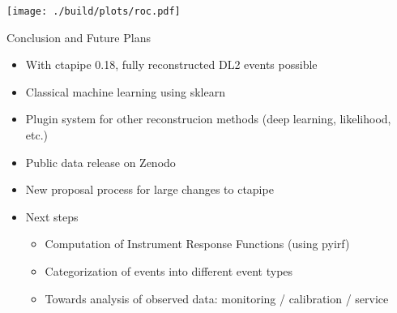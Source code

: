 \documentclass[aspectratio=1610, 9pt]{beamer}
\begin{document}

\begin{frame}[c]
  \centering
  \texttt{[image: ./build/plots/roc.pdf]}
\end{frame}

\begin{frame}{Conclusion and Future Plans}
  \begin{itemize}
    \item With ctapipe 0.18, fully reconstructed DL2 events possible
    \item Classical machine learning using sklearn
    \item Plugin system for other reconstrucion methods (deep learning, likelihood, etc.)
    \item Public data release on Zenodo
    \item New proposal process for large changes to ctapipe
    \item Next steps
      \begin{itemize}
        \item Computation of Instrument Response Functions (using pyirf)
        \item Categorization of events into different event types
        \item Towards analysis of observed data: monitoring / calibration / service
      \end{itemize}
  \end{itemize}
\end{frame}
\end{document}
